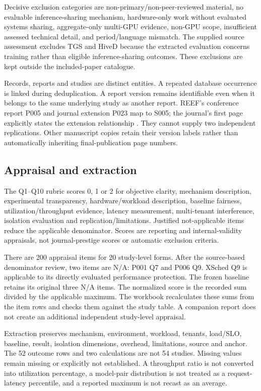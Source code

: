 Decisive exclusion categories are non-primary/non-peer-reviewed material, no evaluable inference-sharing mechanism, hardware-only work without evaluated systems sharing, aggregate-only multi-GPU evidence, non-GPU scope, insufficient assessed technical detail, and period/language mismatch. The supplied source assessment excludes TGS and HiveD because the extracted evaluation concerns training rather than eligible inference-sharing outcomes. These exclusions are kept outside the included-paper catalogue.

Records, reports and studies are distinct entities. A repeated database occurrence is linked during deduplication. A report version remains identifiable even when it belongs to the same underlying study as another report. REEF's conference report P005 and journal extension P023 map to S005; the journal's first page explicitly states the extension relationship \cite{P005,P023}. They cannot supply two independent replications. Other manuscript copies retain their version labels rather than automatically inheriting final-publication page numbers.

\subsection{Appraisal and extraction}
The Q1--Q10 rubric scores 0, 1 or 2 for objective clarity, mechanism description, experimental transparency, hardware/workload description, baseline fairness, utilization/throughput evidence, latency measurement, multi-tenant interference, isolation evaluation and replication/limitations. Justified not-applicable items reduce the applicable denominator. Scores are reporting and internal-validity appraisals, not journal-prestige scores or automatic exclusion criteria.

There are 200 appraisal items for 20 study-level forms. After the source-based denominator review, two items are N/A: P001 Q7 and P006 Q9. XSched Q9 is applicable to its directly evaluated performance protection. The frozen baseline retains its original three N/A items. The normalized score is the recorded sum divided by the applicable maximum. The workbook recalculates these sums from the item rows and checks them against the study table. A companion report does not create an additional independent study-level appraisal.

Extraction preserves mechanism, environment, workload, tenants, load/SLO, baseline, result, isolation dimensions, overhead, limitations, source and anchor. The 52 outcome rows and two calculations are not 54 studies. Missing values remain missing or explicitly not established. A throughput ratio is not converted into utilization percentage, a model-pair distribution is not treated as a request-latency percentile, and a reported maximum is not recast as an average.

